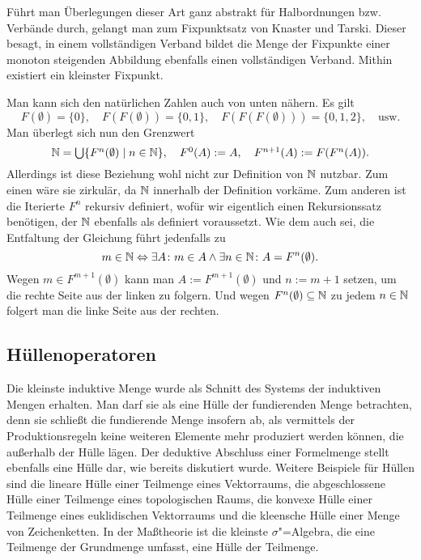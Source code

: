 Führt man Überlegungen dieser Art ganz abstrakt für Halbordnungen
bzw. Verbände durch, gelangt man zum Fixpunktsatz von Knaster und
Tarski. Dieser besagt, in einem vollständigen Verband bildet die Menge
der Fixpunkte einer monoton steigenden Abbildung ebenfalls einen
vollständigen Verband. Mithin existiert ein kleinster Fixpunkt.

Man kann sich den natürlichen Zahlen auch von unten nähern. Es gilt
\[F(\emptyset) = \{0\},\quad F(F(\emptyset)) = \{0,1\},\quad
F(F(F(\emptyset))) = \{0,1,2\},\quad\text{usw.}\]
Man überlegt sich nun den Grenzwert
\[\textstyle\mathbb N = \bigcup\{F^n(\emptyset)\mid n\in\mathbb N\},\quad
F^0(A):=A,\quad F^{n+1}(A) := F(F^n(A)).\]
Allerdings ist diese Beziehung wohl nicht zur Definition von
$\mathbb N$ nutzbar. Zum einen wäre sie zirkulär, da $\mathbb N$ innerhalb der
Definition vorkäme. Zum anderen ist die Iterierte $F^n$ rekursiv
definiert, wofür wir eigentlich einen Rekursionssatz benötigen, der
$\mathbb N$ ebenfalls als definiert voraussetzt. Wie dem auch sei, die
Entfaltung der Gleichung führt jedenfalls zu
\[m\in\mathbb N \Leftrightarrow \exists A\colon m\in A\land\exists n\in\mathbb N\colon A=F^n(\emptyset).\]
Wegen $m\in F^{m+1}(\emptyset)$ kann man $A:=F^{m+1}(\emptyset)$
und $n:=m+1$ setzen, um die rechte Seite aus der linken zu folgern.
Und wegen $F^n(\emptyset)\subseteq\mathbb N$ zu jedem $n\in\mathbb N$ folgert man
die linke Seite aus der rechten.

\subsection{Hüllenoperatoren}

Die kleinste induktive Menge wurde als Schnitt des Systems
der induktiven Mengen erhalten. Man darf sie als eine Hülle der
fundierenden Menge betrachten, denn sie schließt die fundierende Menge
insofern ab, als vermittels der Produktionsregeln keine weiteren
Elemente mehr produziert werden können, die außerhalb der Hülle lägen.
Der deduktive Abschluss einer Formelmenge stellt ebenfalls eine Hülle dar,
wie bereits diskutiert wurde.
Weitere Beispiele für Hüllen sind die lineare Hülle einer Teilmenge
eines Vektorraums, die abgeschlossene Hülle einer Teilmenge eines
topologischen Raums, die konvexe Hülle einer Teilmenge eines euklidischen
Vektorraums und die kleensche Hülle einer Menge von Zeichenketten. In
der Maßtheorie ist die kleinste $\sigma$"=Algebra, die eine Teilmenge der
Grundmenge umfasst, eine Hülle der Teilmenge.

